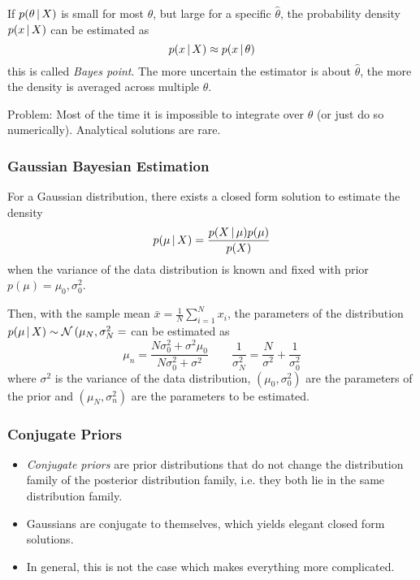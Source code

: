 			If \( p(\theta \,\vert\, X) \) is small for most \(\theta\), but large for a specific \( \hat{\theta} \), the probability density \( p(x \,\vert\, X) \) can be estimated as
			\begin{equation}
				p(x \,\vert\, X) \approx p(x \,\vert\, \theta)
			\end{equation}
			this is called \emph{Bayes point}. The more uncertain the estimator is about \( \hat{\theta} \), the more the density is averaged across multiple \(\theta\).

			Problem: Most of the time it is impossible to integrate over \(\theta\) (or just do so numerically). Analytical solutions are rare.

			\subsubsection{Gaussian Bayesian Estimation}
				For a Gaussian distribution, there exists a closed form solution to estimate the density
				\begin{equation}
					p(\mu \,\vert\, X) = \frac{p(X \,\vert\, \mu) p(\mu)}{p(X)}
				\end{equation}
				when the variance of the data distribution is known and fixed with prior \( p(\mu) = \mathcal{\mu_0, \sigma_0^2} \).

				Then, with the sample mean \( \bar{x} = \frac{1}{N} \sum_{i = 1}^{N} x_i \), the parameters of the distribution \( p(\mu \,\vert\, X) \sim \mathcal{N}\,(\mu_N, \sigma_N^2= \) can be estimated as
				\begin{equation}
					\mu_n = \frac{N\sigma_0^2 + \sigma^2 \mu_0}{N\sigma_0^2 + \sigma^2} \qquad \frac{1}{\sigma_N^2} = \frac{N}{\sigma^2} + \frac{1}{\sigma_0^2}
				\end{equation}
				where \(\sigma^2\) is the variance of the data distribution, \( (\mu_0, \sigma_0^2) \) are the parameters of the prior and \( (\mu_N, \sigma_n^2) \) are the parameters to be estimated.

		\subsubsection{Conjugate Priors}
			\begin{itemize}
				\item \emph{Conjugate priors} are prior distributions that do not change the distribution family of the posterior distribution family, i.e. they both lie in the same distribution family.
				\item Gaussians are conjugate to themselves, which yields elegant closed form solutions.
				\item In general, this is not the case which makes everything more complicated.
			\end{itemize}

